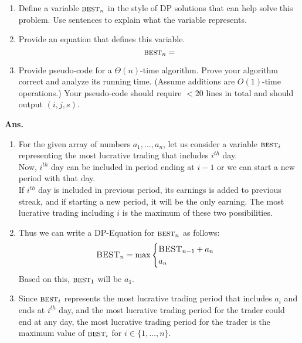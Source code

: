 \documentclass[11pt]{article}
\begin{document}
\begin{enumerate}
  \item Define a variable $\textsc{best}_n$ in the style of DP solutions that can help solve this problem. Use sentences to explain what the variable represents.

  \item Provide an equation that defines this variable.
  $$ \textsc{best}_n = $$
  
  \item Provide pseudo-code for a $\Theta(n)$-time algorithm.   Prove your algorithm correct and analyze its running time.  (Assume additions are $O(1)$-time operations.) Your pseudo-code should require $<20$ lines in total and should output $(i,j,s)$.
\end{enumerate}
\noindent \textbf{Ans.}
\begin{enumerate}
    \item For the given array of numbers $a_1,\ldots,a_n$, let us consider a variable $\textsc{best}_i$ representing the most lucrative trading that includes $i^{th}$ day. \\
    Now, $i^{th}$ day can be included in period ending at $i-1$ or we can start a new period with that day.\\
    If $i^{th}$ day is included in previous period, its earnings is added to previous streak, and if starting a new period, it will be the only earning. The most lucrative trading including $i$ is the maximum of these two possibilities.
    \item Thus we can write a DP-Equation for $\textsc{best}_n$ as follows:
    \begin{equation}\label{2_1}
        \begin{split}
           \textsc{BEST}_n &= \max
           \begin{cases}
                \textsc{BEST}_{n-1} + a_n\\
                a_n
            \end{cases}\\
        \end{split}
    \end{equation}
    Based on this, $\textsc{best}_1$ will be $a_1$.
    \item Since $\textsc{best}_i$ represents the most lucrative trading period that includes $a_i$ and ends at $i^{th}$ day, and the most lucrative trading period for the trader could end at any day, the most lucrative trading period for the trader is the maximum value of $\textsc{best}_i$ for $i \in \{1,\ldots,n\}$.\\

\end{enumerate}
\end{document}
